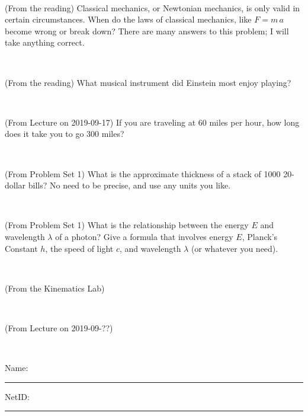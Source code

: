 \documentclass[12pt, letterpaper]{article}
\begin{document}
\vfill ~

\begin{problem} (From the reading)
Classical mechanics, or Newtonian mechanics, is only valid in certain
circumstances. When do the laws of classical mechanics, like $F =
m\,a$ become wrong or break down? There are many answers to this
problem; I will take anything correct.
\end{problem}


\vfill ~

\begin{problem} (From the reading)
What musical instrument did Einstein most enjoy playing?
\end{problem}


\vfill ~

\begin{problem} (From Lecture on 2019-09-17)
If you are traveling at 60 miles per hour, how long does
it take you to go 300 miles?
\end{problem}


\vfill ~


\clearpage


\begin{problem} (From Problem Set 1)
What is the approximate thickness of a stack of 1000 20-dollar bills?
No need to be precise, and use any units you like.
\end{problem}


\vfill ~

\begin{problem} (From Problem Set 1)
What is the relationship between the energy $E$ and wavelength
$\lambda$ of a photon? Give a formula that involves energy $E$,
Planck's Constant $h$, the speed of light $c$, and wavelength
$\lambda$ (or whatever you need).
\end{problem}

\vfill ~

\begin{problem} (From the Kinematics Lab)

\end{problem}


\vfill ~

\begin{problem} (From Lecture on 2019-09-??)
\end{problem}


\vfill ~


\cleardoublepage



\noindent
Name: \rule[-1ex]{0.60\textwidth}{0.1pt}
NetID: \rule[-1ex]{0.20\textwidth}{0.1pt}
\end{document}
